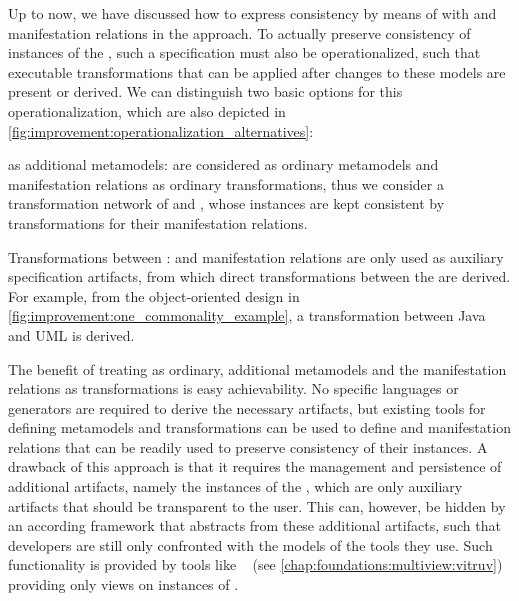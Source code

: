 Up to now, we have discussed how to express consistency by means of \conceptmetamodels with \commonalities and manifestation relations in the \commonalities approach.
To actually preserve consistency of instances of the \concretemetamodels, such a specification must also be operationalized, such that executable transformations that can be applied after changes to these models are present or derived.
We can distinguish two basic options for this operationalization, which are also depicted in \autoref{fig:improvement:operationalization_alternatives}:
\begin{properdescription}
    \item[\Conceptmetamodels as additional metamodels:] \Conceptmetamodels are considered as ordinary metamodels and manifestation relations as ordinary transformations, thus we consider a transformation network of \concretemetamodels and \conceptmetamodels, whose instances are kept consistent by transformations for their manifestation relations. %
    \item[Transformations between \concretemetamodels:] \Conceptmetamodels and manifestation relations are only used as auxiliary specification artifacts, from which direct transformations between the \concretemetamodels are derived. For example, from the object-oriented design \conceptmetamodel in \autoref{fig:improvement:one_commonality_example}, a transformation between Java and \gls{UML} is derived.
\end{properdescription}

The benefit of treating \conceptmetamodels as ordinary, additional metamodels and the manifestation relations as transformations is easy achievability.
No specific languages or generators are required to derive the necessary artifacts, but existing tools for defining metamodels and transformations can be used to define \conceptmetamodels and manifestation relations that can be readily used to preserve consistency of their instances.
A drawback of this approach is that it requires the management and persistence of additional artifacts, namely the instances of the \conceptmetamodels, which are only auxiliary artifacts that should be transparent to the user.
This can, however, be hidden by an according framework that abstracts from these additional artifacts, such that developers are still only confronted with the models of the tools they use.
Such functionality is provided by tools like \vitruv~ (see \autoref{chap:foundations:multiview:vitruv}) providing only views on instances of \concretemetamodels.

